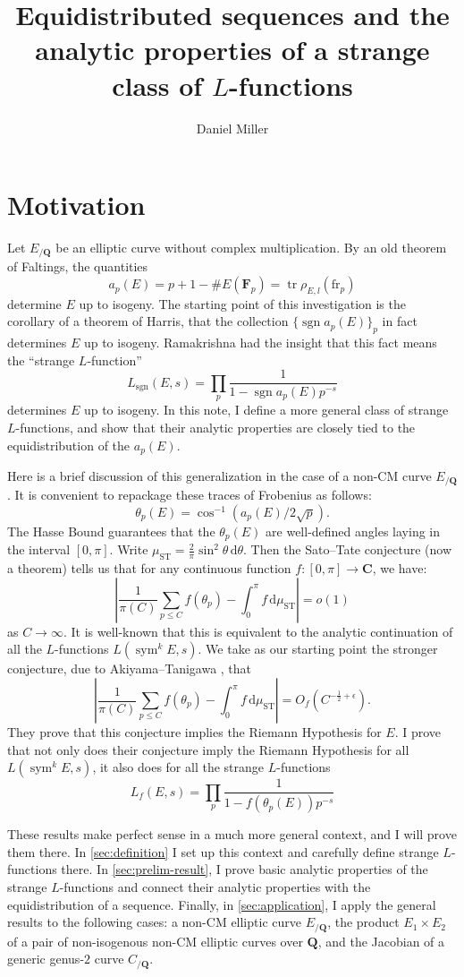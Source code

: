 \documentclass{article}
\title{Equidistributed sequences and the analytic properties of a strange class of $L$-functions}
\author{Daniel Miller}
\DeclareMathOperator{\sgn}{sgn}
\DeclareMathOperator{\sym}{sym}
\DeclareMathOperator{\tr}{tr}
\newcommand{\bC}{\mathbf{C}}
\newcommand{\bF}{\mathbf{F}}
\newcommand{\bQ}{\mathbf{Q}}
\newcommand{\dd}{\mathrm{d}}
\newcommand{\fr}{\mathrm{fr}}
\newcommand{\ST}{\mathrm{ST}}
\theoremstyle{definition}
\begin{document}
\maketitle





\section{Motivation}

Let $E_{/\bQ}$ be an elliptic curve without complex multiplication. By an old 
theorem of Faltings, the quantities 
\[
	a_p(E) = p + 1 - \# E(\bF_p) = \tr \rho_{E,l} (\fr_p)
\]
determine $E$ up to isogeny. The starting point of this investigation is the 
corollary of a theorem of Harris, that the collection $\{\sgn a_p(E)\}_p$ in 
fact determines $E$ up to isogeny. Ramakrishna had the insight that this fact 
means the ``strange $L$-function''
\[
	L_{\sgn}(E,s) = \prod_p \frac{1}{1-\sgn a_p(E) p^{-s}} 
\]
determines $E$ up to isogeny. In this note, I define a more general class of 
strange $L$-functions, and show that their analytic properties are closely 
tied to the equidistribution of the $a_p(E)$. 

Here is a brief discussion of this generalization in the case of a non-CM curve 
$E_{/\bQ}$. It is convenient to repackage these traces of 
Frobenius as follows:
\[
	\theta_p(E) = \cos^{-1}(a_p(E)/2\sqrt p) .
\]
The Hasse Bound guarantees that the $\theta_p(E)$ are well-defined angles 
laying in the interval $[0,\pi]$. Write 
$\mu_\ST = \frac{2}{\pi} \sin^2\theta\, \dd\theta$. Then the Sato--Tate 
conjecture (now a theorem) tells us that for any continuous function 
$f\colon [0,\pi]\to \bC$, we have:
\[
	\left| \frac{1}{\pi(C)} \sum_{p\leqslant C} f(\theta_p) - \int_0^\pi f\, \dd \mu_\ST\right| = o(1)
\]
as $C\to \infty$. It is well-known that this is equivalent to the analytic 
continuation of all the $L$-functions $L(\sym^k E,s)$. We take as our starting 
point the stronger conjecture, due to Akiyama--Tanigawa 
\cite{akiyama-tanigawa}, that 
\[
	\left| \frac{1}{\pi(C)} \sum_{p\leqslant C} f(\theta_p) - \int_0^\pi f\, \dd \mu_\ST\right| = O_f(C^{-\frac 1 2+\epsilon}) .
\]
They prove that this conjecture implies the Riemann Hypothesis for $E$. I 
prove that not only does their conjecture imply the Riemann Hypothesis for all 
$L(\sym^k E,s)$, it also does for all the strange $L$-functions 
\[
	L_f(E,s) = \prod_p \frac{1}{1-f(\theta_p(E)) p^{-s}}
\]

These results make perfect sense in a much more general context, and I will 
prove them there. In \autoref{sec:definition} I set up this context and 
carefully define strange $L$-functions there. In \autoref{sec:prelim-result}, I 
prove basic analytic properties of the strange $L$-functions and 
connect their analytic properties with the equidistribution of a sequence. 
Finally, in \autoref{sec:application}, I apply the general results to the 
following cases: a non-CM elliptic curve $E_{/\bQ}$, the product 
$E_1\times E_2$ of a pair of non-isogenous non-CM elliptic curves over $\bQ$, 
and the Jacobian of a generic genus-$2$ curve $C_{/\bQ}$. 
\end{document}
